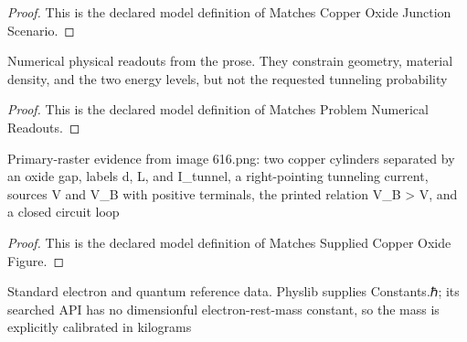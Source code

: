 \begin{proof}
  This is the declared model definition of Matches Copper Oxide Junction Scenario.
\end{proof}
\begin{definition}
  \label{def:physics:phyx-mini-0616:phyxminiproblems-problemphyxmini0616-matchesproblemnumericalreadouts}
  Numerical physical readouts from the prose. They constrain geometry, material density, and the two energy levels, but not the requested tunneling probability
\end{definition}
\begin{proof}
  This is the declared model definition of Matches Problem Numerical Readouts.
\end{proof}
\begin{definition}
  \label{def:physics:phyx-mini-0616:phyxminiproblems-problemphyxmini0616-matchessuppliedcopperoxidefigure}
  Primary-raster evidence from image 616.png: two copper cylinders separated by an oxide gap, labels d, L, and I\_tunnel, a right-pointing tunneling current, sources V and V\_B with positive terminals, the printed relation V\_B > V, and a closed circuit loop
\end{definition}
\begin{proof}
  This is the declared model definition of Matches Supplied Copper Oxide Figure.
\end{proof}
\begin{definition}
  \label{def:physics:phyx-mini-0616:phyxminiproblems-problemphyxmini0616-usesstandardelectronreferencedata}
  Standard electron and quantum reference data. Physlib supplies Constants.ℏ; its searched API has no dimensionful electron-rest-mass constant, so the mass is explicitly calibrated in kilograms
\end{definition}
